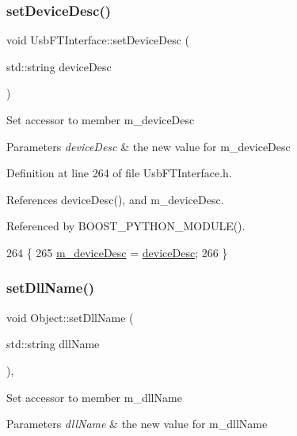 \subsubsection{\texorpdfstring{set\+Device\+Desc()}{setDeviceDesc()}}
{\footnotesize\ttfamily void Usb\+F\+T\+Interface\+::set\+Device\+Desc (\begin{DoxyParamCaption}\item[{std\+::string}]{device\+Desc }\end{DoxyParamCaption})\hspace{0.3cm}{\ttfamily [inline]}}

Set accessor to member m\+\_\+device\+Desc 
\begin{DoxyParams}{Parameters}
{\em device\+Desc} & the new value for m\+\_\+device\+Desc \\
\hline
\end{DoxyParams}


Definition at line 264 of file Usb\+F\+T\+Interface.\+h.



References device\+Desc(), and m\+\_\+device\+Desc.



Referenced by B\+O\+O\+S\+T\+\_\+\+P\+Y\+T\+H\+O\+N\+\_\+\+M\+O\+D\+U\+L\+E().


\begin{DoxyCode}
264                                             \{
265     \hyperlink{classUsbFTInterface_a500067688c32cdb3719fecf128e88dca}{m\_deviceDesc} = \hyperlink{classUsbFTInterface_af353796fd68a869ea5c8e753aa65dc2c}{deviceDesc};
266   \}
\end{DoxyCode}
\mbox{\label{classObject_a870c5af919958c2136623b2d7816d123}} 
\subsubsection{\texorpdfstring{set\+Dll\+Name()}{setDllName()}}
{\footnotesize\ttfamily void Object\+::set\+Dll\+Name (\begin{DoxyParamCaption}\item[{std\+::string}]{dll\+Name }\end{DoxyParamCaption})\hspace{0.3cm}{\ttfamily [inline]}, {\ttfamily [inherited]}}

Set accessor to member m\+\_\+dll\+Name 
\begin{DoxyParams}{Parameters}
{\em dll\+Name} & the new value for m\+\_\+dll\+Name \\
\hline
\end{DoxyParams}



